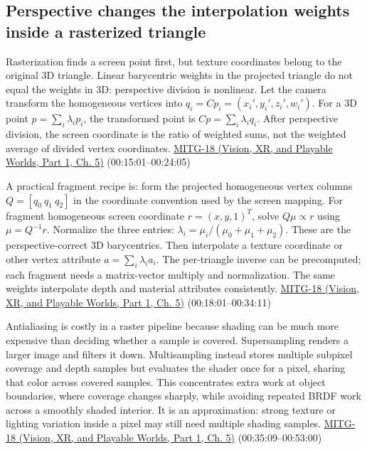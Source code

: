 \subsection{Perspective changes the interpolation weights inside a rasterized triangle}\label{03-visual-computing-i-ch015-perspective-changes-the-interpolation-weights-inside-a-rasterized-triangle}

\hypertarget{03-visual-computing-i-ch015-perspective-changes-the-interpolation-weights-inside-a-rasterized-triangle}{}

Rasterization finds a screen point first, but texture coordinates belong to the original 3D triangle. Linear barycentric weights in the projected triangle do not equal the weights in 3D: perspective division is nonlinear. Let the camera transform the homogeneous vertices into \(q_i=Cp_i=(x_i',y_i',z_i',w_i')\). For a 3D point \(p=\sum_i\lambda_i p_i\), the transformed point is \(Cp=\sum_i\lambda_i q_i\). After perspective division, the screen coordinate is the ratio of weighted sums, not the weighted average of divided vertex coordinates. \href{../07-Vision-XR-and-Playable-Worlds-P01/main.pdf\#nameddest=04-visual-computing-ii-ch036-mitg-18---rasterization-ii}{MITG-18 (Vision, XR, and Playable Worlds, Part 1, Ch. 5)} (00:15:01--00:24:05)

A practical fragment recipe is: form the projected homogeneous vertex columns \(Q=[q_0\ q_1\ q_2]\) in the coordinate convention used by the screen mapping. For fragment homogeneous screen coordinate \(r=(x,y,1)^T\), solve \(Q\mu\propto r\) using \(\mu=Q^{-1}r\). Normalize the three entries: \(\lambda_i=\mu_i/(\mu_0+\mu_1+\mu_2)\). These are the perspective-correct 3D barycentrics. Then interpolate a texture coordinate or other vertex attribute \(a=\sum_i\lambda_i a_i\). The per-triangle inverse can be precomputed; each fragment needs a matrix-vector multiply and normalization. The same weights interpolate depth and material attributes consistently. \href{../07-Vision-XR-and-Playable-Worlds-P01/main.pdf\#nameddest=04-visual-computing-ii-ch036-mitg-18---rasterization-ii}{MITG-18 (Vision, XR, and Playable Worlds, Part 1, Ch. 5)} (00:18:01--00:34:11)

Antialiasing is costly in a raster pipeline because shading can be much more expensive than deciding whether a sample is covered. Supersampling renders a larger image and filters it down. Multisampling instead stores multiple subpixel coverage and depth samples but evaluates the shader once for a pixel, sharing that color across covered samples. This concentrates extra work at object boundaries, where coverage changes sharply, while avoiding repeated BRDF work across a smoothly shaded interior. It is an approximation: strong texture or lighting variation inside a pixel may still need multiple shading samples. \href{../07-Vision-XR-and-Playable-Worlds-P01/main.pdf\#nameddest=04-visual-computing-ii-ch036-mitg-18---rasterization-ii}{MITG-18 (Vision, XR, and Playable Worlds, Part 1, Ch. 5)} (00:35:09--00:53:00)

